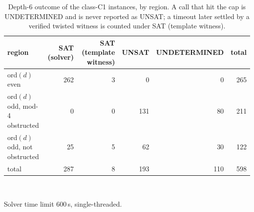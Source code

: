 \begin{table}[tb]
\centering
\small
\caption{Depth-6 outcome of the class-C1 instances, by region.  A call that hit the cap is UNDETERMINED and is never reported as UNSAT; a timeout later settled by a verified twisted witness is counted under SAT (template witness).}
\label{tabS:c1}
\begin{tabular}{lrrrrr}
\toprule
region & SAT (solver) & SAT (template witness) & UNSAT & UNDETERMINED & total \\
\midrule
ord$(d)$ even & 262 & 3 & 0 & 0 & 265 \\
ord$(d)$ odd, mod-4 obstructed & 0 & 0 & 131 & 80 & 211 \\
ord$(d)$ odd, not obstructed & 25 & 5 & 62 & 30 & 122 \\
total & 287 & 8 & 193 & 110 & 598 \\
\bottomrule
\end{tabular}
\\[2pt]\begin{minipage}{\linewidth}\footnotesize Solver time limit 600\,s, single-threaded.\end{minipage}
\end{table}
